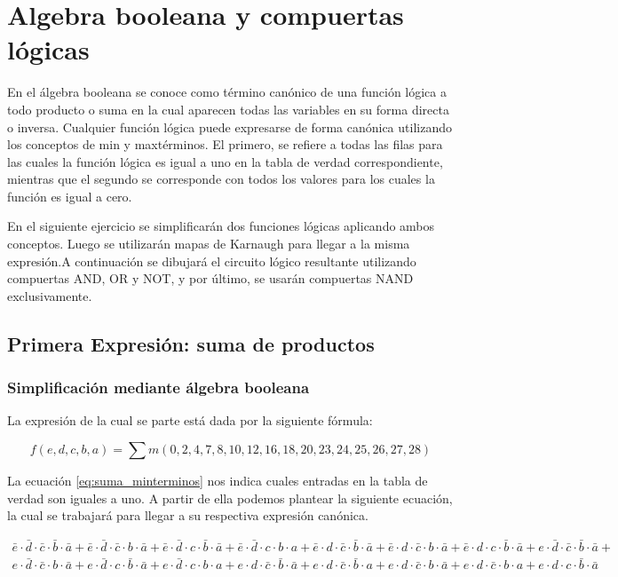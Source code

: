 \section{Algebra booleana y compuertas lógicas}

En el álgebra booleana se conoce como término canónico de una función lógica a todo producto o suma en la cual aparecen todas las variables en su forma directa o inversa. Cualquier función lógica puede expresarse de forma canónica utilizando los conceptos de min y maxtérminos. El primero, se refiere a todas las filas para las cuales la función lógica es igual a uno en la tabla de verdad  correspondiente, mientras que el segundo se corresponde con todos los valores para los cuales la función es igual a cero. 

En el siguiente ejercicio se simplificarán dos funciones lógicas aplicando ambos conceptos. Luego se utilizarán mapas de Karnaugh para llegar a la misma expresión.A continuación se dibujará el circuito lógico resultante utilizando compuertas AND, OR y NOT, y por último, se usarán compuertas NAND exclusivamente.

\subsection{Primera Expresión: suma de productos}

\subsubsection{Simplificación mediante álgebra booleana}

La expresión de la cual se parte está dada por la siguiente fórmula:

\begin{equation}\label{eq:suma_minterminos}
f(e,d,c,b,a) = \sum{m(0, 2, 4, 7, 8, 10, 12, 16, 18, 20, 23, 24, 25, 26, 27, 28)}
\end{equation}

La ecuación \ref{eq:suma_minterminos} nos indica cuales entradas en la tabla de verdad son iguales a uno. A partir de ella podemos plantear la siguiente ecuación, la cual se trabajará para llegar a su respectiva expresión canónica.

\begin{multline}
\bar{e} \cdot \bar{d} \cdot \bar{c} \cdot \bar{b} \cdot \bar{a} + 
\bar{e} \cdot \bar{d} \cdot \bar{c} \cdot b \cdot \bar{a} +
\bar{e} 	\cdot \bar{d} \cdot c \cdot \bar{b} \cdot \bar{a} +
\bar{e} \cdot \bar{d} \cdot c \cdot b \cdot a + 
\bar{e} \cdot d \cdot \bar{c} \cdot \bar{b} \cdot \bar{a} + 
\bar{e} \cdot d \cdot \bar{c} \cdot b \cdot \bar{a} + 
\bar{e} \cdot d \cdot c \cdot \bar{b} \cdot \bar{a} + 
e \cdot \bar{d} \cdot \bar{c} \cdot \bar{b} \cdot \bar{a} + \\
e \cdot \bar{d} \cdot \bar{c} \cdot b \cdot \bar{a} + 
e \cdot \bar{d} \cdot c \cdot \bar{b} \cdot \bar{a} + 		
e \cdot \bar{d} \cdot c \cdot b \cdot a + 
e \cdot d \cdot \bar{c} \cdot \bar{b} \cdot \bar{a} + 
e \cdot d \cdot \bar{c} \cdot \bar{b} \cdot a + 
e \cdot d \cdot \bar{c} \cdot b \cdot \bar{a} + 
e \cdot d \cdot \bar{c} \cdot b \cdot a +
e \cdot d \cdot c \cdot \bar{b} \cdot \bar{a} 
\end{multline}

